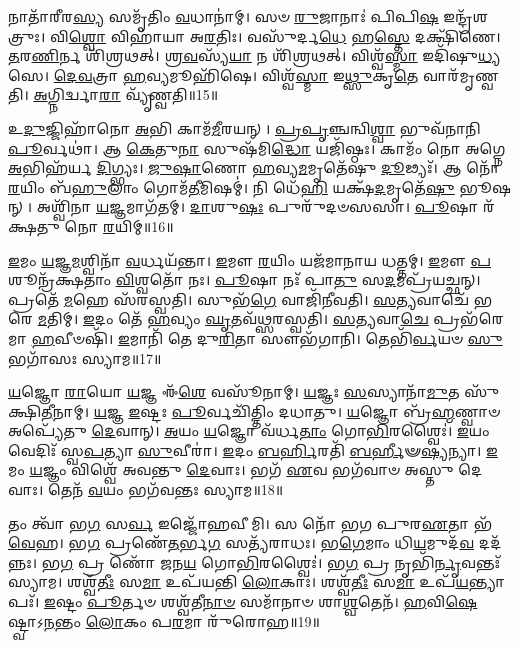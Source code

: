𑌨𑌾𑌤𑌾᳴𑌰𑍀𑌰\-\ul{𑌸𑍍𑌯} 𑌸𑌮𑍃᳴𑌤𑌿𑌂 \ul{𑌵}\-𑌧𑌾𑌨𑌾॑𑌮𑍍।
𑌸𑍞 \ul{𑌰𑍁}\-𑌜𑌾𑌨𑌾𑌃॑ 𑌪𑌿𑌪𑌿\-\ul{𑌷} 𑌇𑌨𑍍𑌦𑍍𑌰᳴𑌶𑌤𑍍𑌰𑍁𑌃।
𑌵𑌿\-\ul{𑌶𑍍𑌵𑍋} 𑌵𑌿𑌹𑌾᳴𑌯𑌾 𑌅\-\ul{𑌰}\-𑌤𑌿𑌃।
𑌵𑌸𑍁᳴𑌰𑍍𑌦\-\ul{𑌧𑍇} 𑌹\-\ul{𑌸𑍍𑌤𑍇} 𑌦𑌕𑍍𑌷𑌿᳴𑌣𑍇।
\-\ul{𑌤}\-𑌰\-\ul{𑌣𑌿}\-𑌰𑍍𑌨 𑌶𑌿᳴𑌶𑍍𑌰𑌥𑌤𑍍।
\-\ul{𑌶𑍍𑌰}\-\-\ul{𑌵}\-𑌸𑍍𑌯᳴\-\ul{𑌯𑌾} 𑌨 𑌶𑌿᳴𑌶𑍍𑌰𑌥𑌤𑍍।
𑌵𑌿𑌶𑍍𑌵᳴\-\ul{𑌸𑍍𑌮𑌾} 𑌇𑌦𑌿᳴𑌷𑍁\-\ul{𑌧𑍍𑌯}\-𑌸𑍇।
\-\ul{𑌦𑍇}\-\-\ul{𑌵}\-𑌤𑍍𑌰𑌾 \ul{𑌹}\-𑌵𑍍𑌯𑌮𑍂𑌹𑌿᳴𑌷𑍇।
𑌵𑌿𑌶𑍍𑌵᳴\-\ul{𑌸𑍍𑌮𑌾} 𑌇\-\ul{𑌥𑍍𑌸𑍁}\-𑌕𑍃\-\ul{𑌤𑍇} 𑌵𑌾𑌰᳴𑌮𑍃𑌣𑍍𑌵𑌤𑌿।
\-\ul{𑌅}\-𑌗𑍍𑌨𑌿𑌰𑍍𑌦𑍍𑌵𑌾\-\ul{𑌰𑌾} 𑌵𑍍𑌯𑍃᳴𑌣𑍍𑌵𑌤𑌿॥15॥

𑌉\-\ul{𑌦𑍁}\-𑌜𑍍𑌜𑌿𑌹𑌾᳴𑌨𑍋 \ul{𑌅}\-𑌭𑌿 𑌕𑌾𑌮᳴\-\ul{𑌮𑍀}\-𑌰𑌯𑌨𑍍।
\-\ul{𑌪𑍍𑌰}\-\-\ul{𑌪𑍃}\-𑌞𑍍𑌚𑌨𑍍𑌵𑌿\-\ul{𑌶𑍍𑌵𑌾} 𑌭𑍁𑌵᳴𑌨𑌾𑌨𑌿 \ul{𑌪𑍂}\-𑌰𑍍𑌵𑌥𑌾॑।
𑌆 \ul{𑌕𑍇}\-𑌤𑍁\-\ul{𑌨𑌾} 𑌸𑍁𑌷᳴𑌮𑌿\-\ul{𑌦𑍍𑌧𑍋} 𑌯𑌜𑌿᳴𑌷𑍍𑌠𑌃।
𑌕𑌾𑌮𑌂᳴ 𑌨𑍋 𑌅𑌗𑍍𑌨𑍇 \ul{𑌅}\-𑌭𑌿𑌹᳴𑌰𑍍𑌯 \ul{𑌦𑌿}\-𑌗𑍍𑌭𑍍𑌯𑌃।
\-\ul{𑌜𑍁}\-\-\ul{𑌷𑌾}\-𑌣𑍋 \ul{𑌹}\-𑌵𑍍𑌯\-\ul{𑌮}\-𑌮𑍃𑌤𑍇᳴𑌷𑍁 \ul{𑌦𑍂}\-𑌢𑍍𑌯𑌃᳴।
𑌆 𑌨𑍋᳴ \ul{𑌰}\-𑌯𑌿𑌂 𑌬᳴\-\ul{𑌹𑍁}\-𑌲𑌾𑌂 𑌗𑍋𑌮᳴\-\ul{𑌤𑍀}\-𑌮𑌿𑌷𑌮𑍍॑।
𑌨𑌿 𑌧𑍇᳴\-\ul{𑌹𑌿} 𑌯𑌕𑍍𑌷᳴\-\ul{𑌦}\-𑌮𑍃𑌤𑍇᳴\-\ul{𑌷𑍁} 𑌭𑍂𑌷𑌨𑍍।
𑌅𑌶𑍍𑌵𑌿᳴𑌨𑌾 \ul{𑌯}\-𑌜𑍍𑌞𑌮𑌾𑌗᳴𑌤𑌮𑍍।
\-\ul{𑌦𑌾}\-𑌶𑍁\-\ul{𑌷𑌃} 𑌪𑍁𑌰𑍁᳴𑌦𑍞𑌸𑌸𑌾।
\-\ul{𑌪𑍂}\-𑌷𑌾 𑌰᳴𑌕𑍍𑌷𑌤𑍁 𑌨𑍋 \ul{𑌰}\-𑌯𑌿𑌮𑍍॥16॥

\-\ul{𑌇}\-𑌮𑌂 \ul{𑌯}\-𑌜𑍍𑌞\-\ul{𑌮}\-𑌶𑍍𑌵𑌿𑌨𑌾᳴ \ul{𑌵}\-𑌰𑍍𑌧𑌯᳴𑌨𑍍𑌤𑌾।
\-\ul{𑌇}\-𑌮𑍗 \ul{𑌰}\-𑌯𑌿𑌂 𑌯𑌜᳴𑌮𑌾𑌨𑌾𑌯 𑌧𑌤𑍍𑌤𑌮𑍍।
\-\ul{𑌇}\-𑌮𑍗 \ul{𑌪}\-𑌶𑍂𑌨𑍍𑌰᳴𑌕𑍍𑌷𑌤𑌾𑌂 \ul{𑌵𑌿}\-𑌶𑍍𑌵𑌤𑍋᳴ 𑌨𑌃।
\-\ul{𑌪𑍂}\-𑌷𑌾 𑌨𑌃᳴ 𑌪𑌾\-\ul{𑌤𑍁} 𑌸\-\ul{𑌦}\-𑌮𑌪𑍍𑌰᳴𑌯𑌚𑍍𑌛𑌨𑍍।
𑌪𑍍𑌰𑌤𑍇᳴ \ul{𑌮}\-𑌹𑍇 𑌸᳴𑌰𑌸𑍍𑌵𑌤𑌿।
𑌸𑍁𑌭᳴\-\ul{𑌗𑍇} 𑌵𑌾𑌜𑌿᳴𑌨𑍀𑌵𑌤𑌿।
\-\ul{𑌸}\-\-\ul{𑌤𑍍𑌯}\-𑌵𑌾𑌚𑍇᳴ 𑌭𑌰𑍇 \ul{𑌮}\-𑌤𑌿𑌮𑍍।
\-\ul{𑌇}\-𑌦𑌂 𑌤𑍇᳴ \ul{𑌹}\-𑌵𑍍𑌯𑌂 \ul{𑌘𑍃}\-𑌤𑌵᳴𑌥𑍍𑌸𑌰𑌸𑍍𑌵𑌤𑌿।
\-\ul{𑌸}\-\-\ul{𑌤𑍍𑌯}\-𑌵𑌾\-\ul{𑌚𑍇} 𑌪𑍍𑌰𑌭᳴𑌰𑍇𑌮𑌾 \ul{𑌹}\-𑌵𑍀𑍞𑌷𑌿᳴।
\-\ul{𑌇}\-𑌮𑌾𑌨𑌿᳴ 𑌤𑍇 𑌦𑍁\-\ul{𑌰𑌿}\-𑌤𑌾 𑌸𑍗𑌭᳴𑌗𑌾𑌨𑌿।
𑌤𑍇𑌭𑌿᳴\-\ul{𑌰𑍍𑌵}\-𑌯𑍞 \ul{𑌸𑍁}\-𑌭𑌗𑌾᳴𑌸𑌃 𑌸𑍍𑌯𑌾𑌮॥17॥\anuvakamend[\-\ul{𑌵}\-𑌜𑍍𑌰𑍍𑌯𑌹𑍀᳴𑌨𑌾𑌮𑍃\-\ul{𑌜𑍀}\-𑌷𑌂 𑌵𑍍𑌯𑍃᳴𑌣𑍍𑌵𑌤𑌿 𑌰𑌕𑍍𑌷𑌤𑍁 𑌨𑍋 \ul{𑌰}\-𑌯𑌿𑍞 𑌸𑍗𑌭᳴\-\ul{𑌗𑌾}\-𑌨𑍍𑌯𑍇𑌕𑌂᳴ 𑌚]

\-\ul{𑌯}\-𑌜𑍍𑌞𑍋 \ul{𑌰𑌾}\-𑌯𑍋 \ul{𑌯}\-𑌜𑍍𑌞 𑌈᳴\-\ul{𑌶𑍇} 𑌵𑌸𑍂᳴𑌨𑌾𑌮𑍍।
\-\ul{𑌯}\-𑌜𑍍𑌞𑌃 \ul{𑌸}\-𑌸𑍍𑌯𑌾𑌨𑌾᳴\-\ul{𑌮𑍁}\-𑌤 𑌸𑍁᳴𑌕𑍍𑌷𑌿\-\ul{𑌤𑍀}\-𑌨𑌾𑌮𑍍।
\-\ul{𑌯}\-𑌜𑍍𑌞 \ul{𑌇}\-𑌷𑍍𑌟𑌃 \ul{𑌪𑍂}\-𑌰𑍍𑌵𑌚𑌿᳴𑌤𑍍𑌤𑌿𑌂 𑌦𑌧𑌾𑌤𑍁।
\-\ul{𑌯}\-𑌜𑍍𑌞𑍋 𑌬𑍍𑌰᳴\-\ul{𑌹𑍍𑌮}\-𑌣𑍍𑌵𑌾𑍞 𑌅𑌪𑍍𑌯𑍇᳴𑌤𑍁 \ul{𑌦𑍇}\-𑌵𑌾𑌨𑍍।
\-\ul{𑌅}\-𑌯𑌂 \ul{𑌯}\-𑌜𑍍𑌞𑍋 𑌵᳴𑌰𑍍𑌧\-\ul{𑌤𑌾𑌂} 𑌗𑍋\-\ul{𑌭𑌿}\-𑌰𑌶𑍍𑌵𑍈𑌃॑।
\-\ul{𑌇}\-𑌯𑌂 𑌵𑍇𑌦𑌿𑌃᳴ 𑌸𑍍𑌵\-\ul{𑌪}\-𑌤𑍍𑌯𑌾 \ul{𑌸𑍁}\-𑌵𑍀𑌰𑌾॑।
\-\ul{𑌇}\-𑌦𑌂 \ul{𑌬}\-\-\ul{𑌰𑍍}\-𑌹𑌿𑌰𑌤𑌿᳴ \ul{𑌬}\-\-\ul{𑌰𑍍}\-𑌹𑍀𑍟\-\ul{𑌷𑍍𑌯}\-𑌨𑍍𑌯𑌾।
\-\ul{𑌇}\-𑌮𑌂 \ul{𑌯}\-𑌜𑍍𑌞𑌂 𑌵𑌿𑌶𑍍𑌵𑍇᳴ 𑌅𑌵𑌨𑍍𑌤𑍁 \ul{𑌦𑍇}\-𑌵𑌾𑌃।
𑌭𑌗᳴ \ul{𑌏}\-𑌵 𑌭𑌗᳴𑌵𑌾𑍞 𑌅𑌸𑍍𑌤𑍁 𑌦𑍇𑌵𑌾𑌃।
𑌤𑍇𑌨᳴ \ul{𑌵}\-𑌯𑌂 𑌭𑌗᳴𑌵𑌨𑍍𑌤𑌃 𑌸𑍍𑌯𑌾𑌮॥18॥

𑌤𑌂 𑌤𑍍𑌵𑌾᳴ 𑌭\-\ul{𑌗} 𑌸\-\ul{𑌰𑍍𑌵} 𑌇𑌜𑍍𑌜𑍋᳴𑌹𑌵𑍀𑌮𑌿।
𑌸 𑌨𑍋᳴ 𑌭𑌗 𑌪𑍁𑌰\-\ul{𑌏}\-𑌤𑌾 𑌭᳴\-\ul{𑌵𑍇}\-𑌹।
𑌭\-\ul{𑌗} 𑌪𑍍𑌰𑌣𑍇᳴\-\ul{𑌤}\-𑌰𑍍𑌭\-\ul{𑌗} 𑌸𑌤𑍍𑌯᳴𑌰𑌾𑌧𑌃।
𑌭\-\ul{𑌗𑍇}\-𑌮𑌾𑌂 𑌧𑌿\-\ul{𑌯}\-𑌮𑍁𑌦᳴\-\ul{𑌵} 𑌦𑌦᳴𑌨𑍍𑌨𑌃।
𑌭\-\ul{𑌗} 𑌪𑍍𑌰 𑌣𑍋᳴ 𑌜𑌨\-\ul{𑌯} 𑌗𑍋\-\ul{𑌭𑌿}\-𑌰𑌶𑍍𑌵𑍈𑌃॑।
𑌭\-\ul{𑌗} 𑌪𑍍𑌰 𑌨𑍃𑌭𑌿᳴\-\ul{𑌰𑍍𑌨𑍃}\-𑌵𑌨𑍍𑌤𑌃᳴ 𑌸𑍍𑌯𑌾𑌮।
𑌶𑌶𑍍𑌵᳴\-\ul{𑌤𑍀𑌃} 𑌸\-\ul{𑌮𑌾} 𑌉𑌪᳴𑌯𑌨𑍍𑌤𑌿 \ul{𑌲𑍋}\-𑌕𑌾𑌃।
𑌶𑌶𑍍𑌵᳴\-\ul{𑌤𑍀𑌃} 𑌸\-\ul{𑌮𑌾} 𑌉𑌪᳴\-\ul{𑌯}\-𑌨𑍍𑌤𑍍𑌯𑌾𑌪𑌃᳴।
\-\ul{𑌇}\-𑌷𑍍𑌟𑌂 \ul{𑌪𑍂}\-𑌰𑍍𑌤𑍞 𑌶𑌶𑍍𑌵᳴𑌤𑍀\-\ul{𑌨𑌾}\-\-\ul{𑍞} 𑌸𑌮𑌾᳴𑌨𑌾𑍞 𑌶𑌾\-\ul{𑌶𑍍𑌵}\-𑌤𑍇𑌨᳴।
\-\ul{𑌹}\-𑌵𑌿\-\ul{𑌷𑍇}\-𑌷𑍍𑌟𑍍𑌵𑌾\-𑌽\-\ul{𑌨}\-𑌨𑍍𑌤𑌂 \ul{𑌲𑍋}\-𑌕𑌂 𑌪\-\ul{𑌰}\-𑌮𑌾 𑌰𑍁᳴𑌰𑍋𑌹॥19॥

